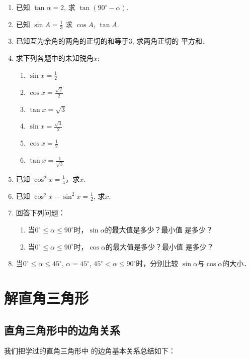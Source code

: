 \begin{enumerate}
\item 已知 $\tan \alpha =2$, 求 $\tan(90^{\circ} -\alpha )$.
\item 已知
$\sin A=\frac{1}{3}$
求 $\cos A$, $\tan A$.
\item 已知互为余角的两角的正切的和等于3, 求两角正切的
平方和．
\item 求下列各题中的未知锐角$x$:
\begin{multicols}{2}
\begin{enumerate}
    \item $\sin x=\frac{1}{2}$
    \item $\cos x=\frac{\sqrt{2}}{2}$
    \item $\tan x=\sqrt{3}$
    \item $\sin x=\frac{\sqrt{3}}{2}$
    \item $\cos x=\frac{1}{2}$
    \item $\tan x=\frac{1}{\sqrt{3}}$
\end{enumerate}
\end{multicols}

\item 已知 $\cos^2 x=\frac{1}{4}$，求$x$.
\item 已知 $\cos^2x-\sin^2x=\frac{1}{2}$, 
求$x$.
\item 回答下列问题：
\begin{enumerate}
\item 当$0^{\circ}\le \alpha\le 90^{\circ}$时，$\sin\alpha$的最大值是多少？最小值
是多少？
\item 当$0^{\circ}\le \alpha\le 90^{\circ}$时，$\cos\alpha$的最大值是多少？最小值
是多少？
\end{enumerate}


\item 当$0^{\circ}\le \alpha\le 45^{\circ}$, $\alpha=45^{\circ}$, $45^{\circ}<\alpha\le 90^{\circ}$时，分别比较
$\sin\alpha$与$\cos\alpha$的大小．
\end{enumerate}

\section{解直角三角形}
\subsection{直角三角形中的边角关系}

我们把学过的直角三角形中
的边角基本关系总结如下：
\begin{figure}[htp]
    \centering
{}
    \caption{}
\end{figure}

